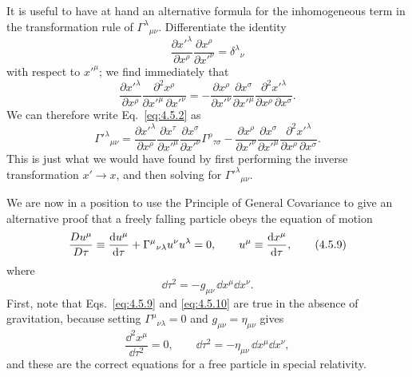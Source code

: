 It is useful to have at hand an alternative formula for the inhomogeneous
term in the transformation rule of \(\Gamma^\lambda{}_{\mu\nu}\).
Differentiate the identity
\[
  \frac{\partial x'^\lambda}{\partial x^\rho}
  \frac{\partial x^\rho}{\partial x'^\nu}
  =\delta^\lambda{}_\nu
\]
with respect to \(x'^\mu\); we find immediately that
\begin{equation}
  \frac{\partial x'^\lambda}{\partial x^\rho}
  \frac{\partial^2x^\rho}
       {\partial x'^\mu\,\partial x'^\nu}
  =
  -
  \frac{\partial x^\rho}{\partial x'^\nu}
  \frac{\partial x^\sigma}{\partial x'^\mu}
  \frac{\partial^2x'^\lambda}
       {\partial x^\rho\,\partial x^\sigma}.
  \tag{4.5.7}\label{eq:4.5.7}
\end{equation}
We can therefore write Eq.~\eqref{eq:4.5.2} as
\begin{equation}
  \Gamma'^\lambda{}_{\mu\nu}
  =
  \frac{\partial x'^\lambda}{\partial x^\rho}
  \frac{\partial x^\tau}{\partial x'^\mu}
  \frac{\partial x^\sigma}{\partial x'^\nu}
  \Gamma^\rho{}_{\tau\sigma}
  -
  \frac{\partial x^\rho}{\partial x'^\nu}
  \frac{\partial x^\sigma}{\partial x'^\mu}
  \frac{\partial^2x'^\lambda}
       {\partial x^\rho\,\partial x^\sigma}.
  \tag{4.5.8}\label{eq:4.5.8}
\end{equation}
This is just what we would have found by first performing the inverse
transformation \(x'\to x\), and then solving for
\(\Gamma'^\lambda{}_{\mu\nu}\).

We are now in a position to use the Principle of General Covariance to give
an alternative proof that a freely falling particle obeys the equation of
motion
\begin{equation}
  \frac{D u^\mu}{D\tau}
  \equiv
  \frac{\mathop{}\!\mathrm{d} u^\mu}{\mathop{}\!\mathrm{d}\tau}
  +\Gamma^\mu{}_{\nu\lambda}u^\nu u^\lambda
  =0,
  \qquad
  u^\mu\equiv\frac{\mathop{}\!\mathrm{d} x^\mu}{\mathop{}\!\mathrm{d}\tau},
  \tag{4.5.9}\label{eq:4.5.9}
\end{equation}
where
\begin{equation}
  \dd\tau^2=-g_{\mu\nu}\,\dd x^\mu\dd x^\nu.
  \tag{4.5.10}\label{eq:4.5.10}
\end{equation}
First, note that Eqs.~\eqref{eq:4.5.9} and \eqref{eq:4.5.10} are true in
the absence of gravitation, because setting
\(\Gamma^\mu{}_{\nu\lambda}=0\) and \(g_{\mu\nu}=\eta_{\mu\nu}\) gives
\[
  \frac{\dd^2x^\mu}{\dd\tau^2}=0,
  \qquad
  \dd\tau^2=-\eta_{\mu\nu}\,\dd x^\mu\dd x^\nu,
\]
and these are the correct equations for a free particle in special
relativity.

